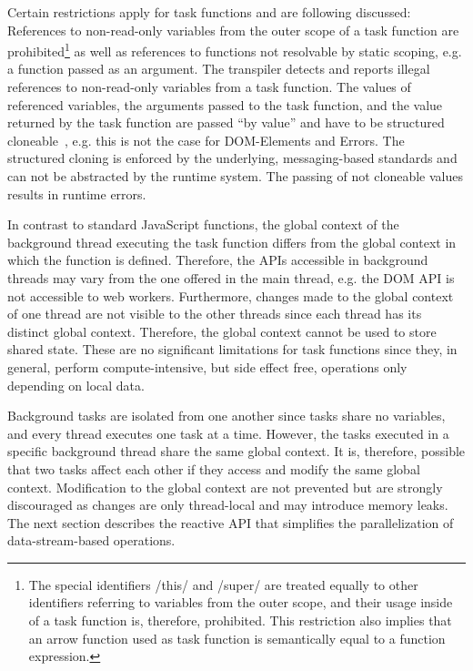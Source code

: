 Certain restrictions apply for task functions and are following discussed: References to non-read-only variables from the outer scope of a task function are prohibited\footnote{The special identifiers \javascriptinline/this/ and \javascriptinline/super/ are treated equally to other identifiers referring to variables from the outer scope, and their usage inside of a task function is, therefore, prohibited. This restriction also implies that an arrow function used as task function is semantically equal to a function expression.} as well as references to functions not resolvable by static scoping, e.g. a function passed as an argument.  The transpiler detects and reports illegal references to non-read-only variables from a task function. The values of referenced variables, the arguments passed to the task function, and the value returned by the task function are passed \enquote{by value} and have to be structured cloneable~\cite[Section 2.9.4]{WHATWG2016}, e.g. this is not the case for DOM-Elements and Errors. The structured cloning is enforced by the underlying, messaging-based standards and can not be abstracted by the runtime system. The passing of not cloneable values results in runtime errors.

In contrast to standard JavaScript functions, the global context of the background thread executing the task function differs from the global context in which the function is defined. Therefore, the APIs accessible in background threads may vary from the one offered in the main thread, e.g. the DOM API is not accessible to web workers. Furthermore, changes made to the global context of one thread are not visible to the other threads since each thread has its distinct global context. Therefore, the global context cannot be used to store shared state. These are no significant limitations for task functions since they, in general, perform compute-intensive, but side effect free, operations only depending on local data.

Background tasks are isolated from one another since tasks share no variables, and every thread executes one task at a time. However, the tasks executed in a specific background thread share the same global context. It is, therefore, possible that two tasks affect each other if they access and modify the same global context. Modification to the global context are not prevented but are strongly discouraged as changes are only thread-local and may introduce memory leaks. The next section describes the reactive API that simplifies the parallelization of data-stream-based operations.

